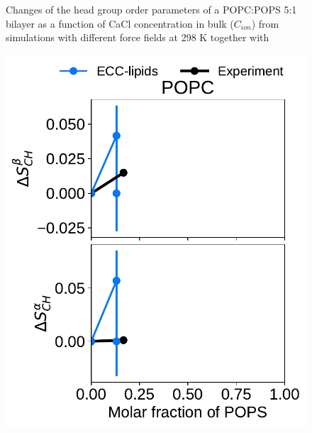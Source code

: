 \documentclass[journal=jpcbfk,manuscript=article]{achemso}
\newlength{\figwidth}
\begin{document}
\begin{figure}[htb!]
  \caption{\label{fig:delta_ordPar_CaCl} 
    Changes of the head group order parameters of a POPC:POPS 5:1 bilayer as a function of CaCl concentration 
    in bulk ($C_{ion}$) from simulations with different force fields at 298 K together with  
  } 
\end{figure} 



\begin{figure}[htb!] 
  \centering 
  \includegraphics[width=\figwidth]{../Fig/l17/order_parameters_changes_A-B_PC-PS_mix_POPC_nacl.pdf} 

\end{figure}
\end{document}
